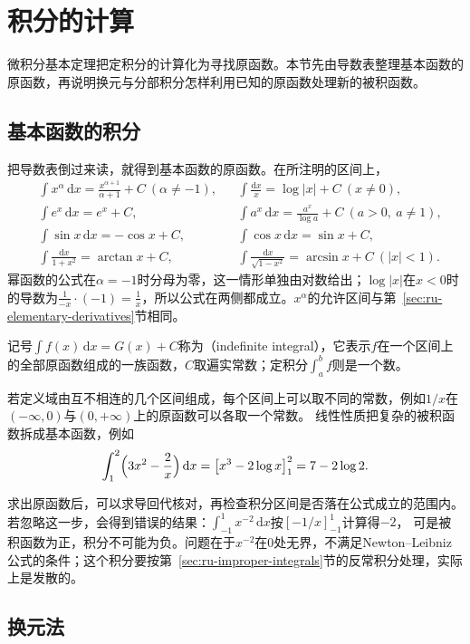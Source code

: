 \section{积分的计算}
\label{sec:ru-integration-methods}

微积分基本定理把定积分的计算化为寻找原函数。本节先由导数表整理基本函数的原函数，再说明换元与分部积分怎样利用已知的原函数处理新的被积函数。

\subsection{基本函数的积分}
\label{sec:ru-basic-antiderivatives}

把导数表倒过来读，就得到基本函数的原函数。在所注明的区间上，
\[
 \begin{aligned}
 &\int x^\alpha\,\mathrm dx=\frac{x^{\alpha+1}}{\alpha+1}+C\ (\alpha\neq-1),&&\int\frac{\mathrm dx}x=\log|x|+C\ (x\neq0),\\
 &\int e^x\,\mathrm dx=e^x+C,&&\int a^x\,\mathrm dx=\frac{a^x}{\log a}+C\ (a>0,\ a\neq1),\\
 &\int\sin x\,\mathrm dx=-\cos x+C,&&\int\cos x\,\mathrm dx=\sin x+C,\\
 &\int\frac{\mathrm dx}{1+x^2}=\arctan x+C,&&\int\frac{\mathrm dx}{\sqrt{1-x^2}}=\arcsin x+C\ (|x|<1).
 \end{aligned}
\]
幂函数的公式在$\alpha=-1$时分母为零，这一情形单独由对数给出；$\log|x|$在$x<0$时的导数为$\frac{1}{-x}\cdot(-1)=\frac1x$，所以公式在两侧都成立。$x^\alpha$的允许区间与第~\ref{sec:ru-elementary-derivatives}节相同。

记号$\int f(x)\,\mathrm dx=G(x)+C$称为（indefinite integral），它表示$f$在一个区间上的全部原函数组成的一族函数，$C$取遍实常数；定积分$\int_a^bf$则是一个数。

若定义域由互不相连的几个区间组成，每个区间上可以取不同的常数，例如$1/x$在$(-\infty,0)$与$(0,+\infty)$上的原函数可以各取一个常数。
线性性质把复杂的被积函数拆成基本函数，例如
\[
 \int_1^2\Bigl(3x^2-\frac2x\Bigr)\,\mathrm dx=\bigl[x^3-2\log x\bigr]_1^2=7-2\log2.
\]

求出原函数后，可以求导回代核对，再检查积分区间是否落在公式成立的范围内。若忽略这一步，会得到错误的结果：$\int_{-1}^1x^{-2}\,\mathrm dx$按$[-1/x]_{-1}^1$计算得$-2$，
可是被积函数为正，积分不可能为负。问题在于$x^{-2}$在$0$处无界，不满足Newton--Leibniz公式的条件；这个积分要按第~\ref{sec:ru-improper-integrals}节的反常积分处理，实际上是发散的。

\subsection{换元法}
\label{sec:ru-substitution}

